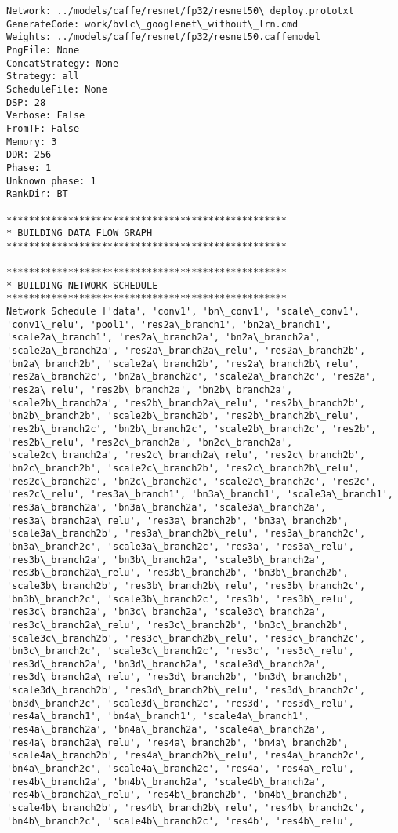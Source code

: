 \documentclass[11pt]{article}
\begin{document}
    \begin{Verbatim}[commandchars=\\\{\}]
Network: ../models/caffe/resnet/fp32/resnet50\_deploy.prototxt
GenerateCode: work/bvlc\_googlenet\_without\_lrn.cmd
Weights: ../models/caffe/resnet/fp32/resnet50.caffemodel
PngFile: None
ConcatStrategy: None
Strategy: all
ScheduleFile: None
DSP: 28
Verbose: False
FromTF: False
Memory: 3
DDR: 256
Phase: 1
Unknown phase: 1
RankDir: BT

**************************************************
* BUILDING DATA FLOW GRAPH
**************************************************

**************************************************
* BUILDING NETWORK SCHEDULE
**************************************************
Network Schedule ['data', 'conv1', 'bn\_conv1', 'scale\_conv1', 'conv1\_relu', 'pool1', 'res2a\_branch1', 'bn2a\_branch1', 'scale2a\_branch1', 'res2a\_branch2a', 'bn2a\_branch2a', 'scale2a\_branch2a', 'res2a\_branch2a\_relu', 'res2a\_branch2b', 'bn2a\_branch2b', 'scale2a\_branch2b', 'res2a\_branch2b\_relu', 'res2a\_branch2c', 'bn2a\_branch2c', 'scale2a\_branch2c', 'res2a', 'res2a\_relu', 'res2b\_branch2a', 'bn2b\_branch2a', 'scale2b\_branch2a', 'res2b\_branch2a\_relu', 'res2b\_branch2b', 'bn2b\_branch2b', 'scale2b\_branch2b', 'res2b\_branch2b\_relu', 'res2b\_branch2c', 'bn2b\_branch2c', 'scale2b\_branch2c', 'res2b', 'res2b\_relu', 'res2c\_branch2a', 'bn2c\_branch2a', 'scale2c\_branch2a', 'res2c\_branch2a\_relu', 'res2c\_branch2b', 'bn2c\_branch2b', 'scale2c\_branch2b', 'res2c\_branch2b\_relu', 'res2c\_branch2c', 'bn2c\_branch2c', 'scale2c\_branch2c', 'res2c', 'res2c\_relu', 'res3a\_branch1', 'bn3a\_branch1', 'scale3a\_branch1', 'res3a\_branch2a', 'bn3a\_branch2a', 'scale3a\_branch2a', 'res3a\_branch2a\_relu', 'res3a\_branch2b', 'bn3a\_branch2b', 'scale3a\_branch2b', 'res3a\_branch2b\_relu', 'res3a\_branch2c', 'bn3a\_branch2c', 'scale3a\_branch2c', 'res3a', 'res3a\_relu', 'res3b\_branch2a', 'bn3b\_branch2a', 'scale3b\_branch2a', 'res3b\_branch2a\_relu', 'res3b\_branch2b', 'bn3b\_branch2b', 'scale3b\_branch2b', 'res3b\_branch2b\_relu', 'res3b\_branch2c', 'bn3b\_branch2c', 'scale3b\_branch2c', 'res3b', 'res3b\_relu', 'res3c\_branch2a', 'bn3c\_branch2a', 'scale3c\_branch2a', 'res3c\_branch2a\_relu', 'res3c\_branch2b', 'bn3c\_branch2b', 'scale3c\_branch2b', 'res3c\_branch2b\_relu', 'res3c\_branch2c', 'bn3c\_branch2c', 'scale3c\_branch2c', 'res3c', 'res3c\_relu', 'res3d\_branch2a', 'bn3d\_branch2a', 'scale3d\_branch2a', 'res3d\_branch2a\_relu', 'res3d\_branch2b', 'bn3d\_branch2b', 'scale3d\_branch2b', 'res3d\_branch2b\_relu', 'res3d\_branch2c', 'bn3d\_branch2c', 'scale3d\_branch2c', 'res3d', 'res3d\_relu', 'res4a\_branch1', 'bn4a\_branch1', 'scale4a\_branch1', 'res4a\_branch2a', 'bn4a\_branch2a', 'scale4a\_branch2a', 'res4a\_branch2a\_relu', 'res4a\_branch2b', 'bn4a\_branch2b', 'scale4a\_branch2b', 'res4a\_branch2b\_relu', 'res4a\_branch2c', 'bn4a\_branch2c', 'scale4a\_branch2c', 'res4a', 'res4a\_relu', 'res4b\_branch2a', 'bn4b\_branch2a', 'scale4b\_branch2a', 'res4b\_branch2a\_relu', 'res4b\_branch2b', 'bn4b\_branch2b', 'scale4b\_branch2b', 'res4b\_branch2b\_relu', 'res4b\_branch2c', 'bn4b\_branch2c', 'scale4b\_branch2c', 'res4b', 'res4b\_relu', 
\end{Verbatim}
\end{document}
